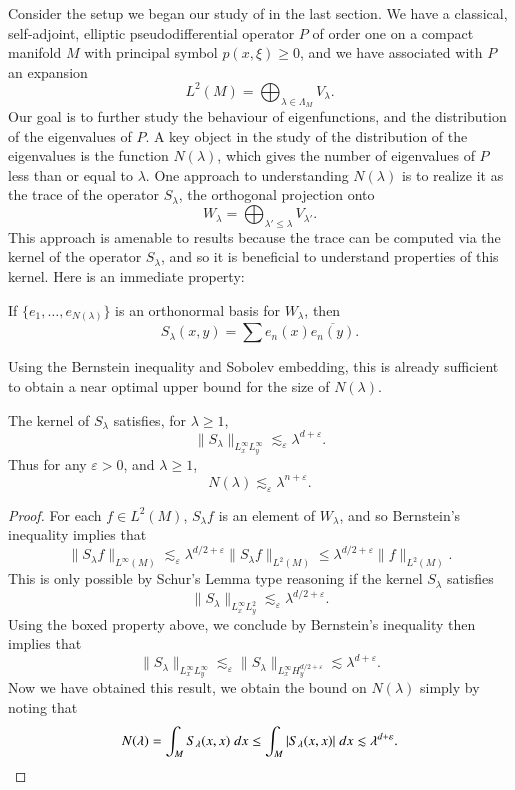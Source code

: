 Consider the setup we began our study of in the last section. We have a classical, self-adjoint, elliptic pseudodifferential operator $P$ of order one on a compact manifold $M$ with principal symbol $p(x,\xi) \geq 0$, and we have associated with $P$ an expansion
%
\[ L^2(M) = \bigoplus_{\lambda \in \Lambda_M} V_\lambda. \]
%
Our goal is to further study the behaviour of eigenfunctions, and the distribution of the eigenvalues of $P$. A key object in the study of the distribution of the eigenvalues is the function $N(\lambda)$, which gives the number of eigenvalues of $P$ less than or equal to $\lambda$. One approach to understanding $N(\lambda)$ is to realize it as the trace of the operator $S_\lambda$, the orthogonal projection onto
%
\[ W_\lambda = \bigoplus\nolimits_{\lambda' \leq \lambda} V_{\lambda'}. \]
%
This approach is amenable to results because the trace can be computed via the kernel of the operator $S_\lambda$, and so it is beneficial to understand properties of this kernel. Here is an immediate property:
%
\begin{mdframed}
    If $\{ e_1, \dots, e_{N(\lambda)} \}$ is an orthonormal basis for $W_\lambda$, then
    \[ S_\lambda(x,y) = \sum e_n(x) \overline{e_n(y)}. \]
\end{mdframed}
%
Using the Bernstein inequality and Sobolev embedding, this is already sufficient to obtain a near optimal upper bound for the size of $N(\lambda)$.

\begin{theorem}
    The kernel of $S_\lambda$ satisfies, for $\lambda \geq 1$,
    \[ \| S_\lambda \|_{L^\infty_x L^\infty_y} \lesssim_\varepsilon \lambda^{d + \varepsilon}. \]
    Thus for any $\varepsilon > 0$, and $\lambda \geq 1$,
    \[ N(\lambda) \lesssim_\varepsilon \lambda^{n + \varepsilon}. \]
\end{theorem}
\begin{proof}
    For each $f \in L^2(M)$, $S_\lambda f$ is an element of $W_\lambda$, and so Bernstein's inequality implies that
    \[ \| S_\lambda f \|_{L^\infty(M)} \lesssim_\varepsilon \lambda^{d/2 + \varepsilon} \| S_\lambda f \|_{L^2(M)} \leq \lambda^{d/2 + \varepsilon} \| f \|_{L^2(M)}. \]
    This is only possible by Schur's Lemma type reasoning if the kernel $S_\lambda$ satisfies
    \[ \| S_\lambda \|_{L^\infty_x L^2_y} \lesssim_\varepsilon \lambda^{d/2 + \varepsilon}. \]
    Using the boxed property above, we conclude by Bernstein's inequality then implies that
    \[ \| S_\lambda \|_{L^\infty_x L^\infty_y} \lesssim_\varepsilon \| S_\lambda \|_{L^\infty_x H^{d/2 + \varepsilon}_y} \lesssim \lambda^{d + \varepsilon}. \]
    Now we have obtained this result, we obtain the bound on $N(\lambda)$ simply by noting that
    \[ N(\lambda) = \int_M S_\lambda(x,x)\; dx \leq \int_M |S_\lambda(x,x)|\; dx \lesssim \lambda^{d + \varepsilon}. \qedhere \]
\end{proof}

